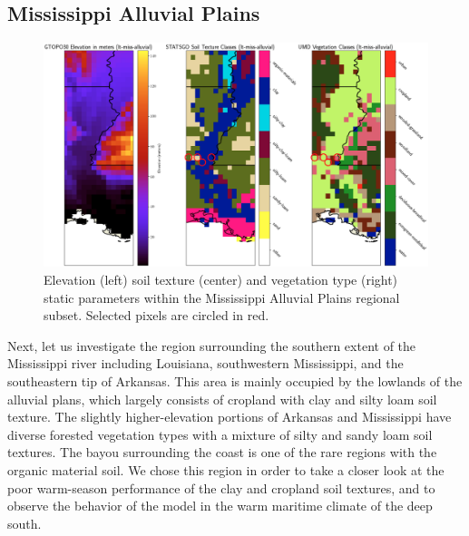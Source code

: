 \subsection{Mississippi Alluvial Plains}

\begin{figure}[h!]
    \centering

    \includegraphics[width=.99\linewidth,draft=false]{figures/lt-static/static_all-3_miss-alluvial_circled.png}

    \caption{Elevation (left) soil texture (center) and vegetation type (right) static parameters within the Mississippi Alluvial Plains regional subset. Selected pixels are circled in red.}
    \label{lt_static_miss-alluvial}
\end{figure}

Next, let us investigate the region surrounding the southern extent of the Mississippi river including Louisiana, southwestern Mississippi, and the southeastern tip of Arkansas. This area is mainly occupied by the lowlands of the alluvial plans, which largely consists of cropland with clay and silty loam soil texture. The slightly higher-elevation portions of Arkansas and Mississippi have diverse forested vegetation types with a mixture of silty and sandy loam soil textures. The bayou surrounding the coast is one of the rare regions with the organic material soil. We chose this region in order to take a closer look at the poor warm-season performance of the clay and cropland soil textures, and to observe the behavior of the model in the warm maritime climate of the deep south.

